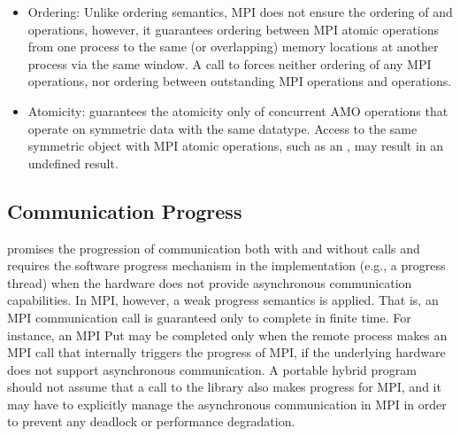 \begin{itemize}
\item Ordering: Unlike \openshmem ordering semantics, MPI does not ensure the
ordering of {\PUT} and {\GET} operations, however, it guarantees ordering between
MPI atomic operations from one process to the same (or overlapping) memory
locations at another process via the same window. A call to 
forces neither ordering of any MPI operations, nor ordering between outstanding
MPI operations
and \openshmem operations.

\item Atomicity:  \openshmem
guarantees the atomicity only of concurrent AMO operations that operate on
symmetric data with the same datatype. Access to the same symmetric object with
MPI atomic operations, such as an , may result in an
undefined result.

\end{itemize}


\subsection{Communication Progress}
\label{subsec:interoperability:progress}

\openshmem promises the progression of communication both with and without
\openshmem calls and requires the software progress mechanism in the implementation
(e.g., a progress thread) when the hardware does not provide asynchronous communication
capabilities. In MPI, however, a weak progress semantics is applied. That is,
an MPI communication call is guaranteed only to complete in finite time. For
instance, an MPI Put may be completed only when the remote process makes an MPI
call that internally triggers the progress of MPI, if the underlying hardware
does not support asynchronous communication. A portable hybrid program
should not assume that a call to the \openshmem library also makes progress for MPI,
and it may have to explicitly manage the asynchronous communication in MPI in
order to prevent any deadlock or performance degradation.

